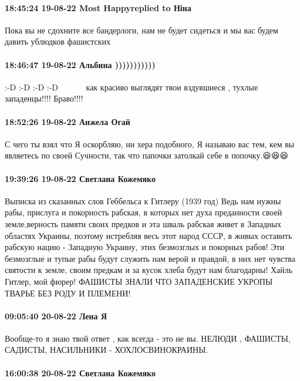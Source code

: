 \paragraph{18:45:24 19-08-22 Most Happyreplied to Ніна}

Пока вы не сдохните все бандерлоги, нам не будет сидеться и мы вас будем давить
ублюдков фашистских

\paragraph{18:46:47 19-08-22 Альбина )))))))))))}

:-D :-D :-D :-D 👏 👏 👏 👏 👏 как красиво выглядят твои вздувшиеся , тухлые
западенцы!!!! Браво!!!!

\paragraph{18:52:26 19-08-22 Анжела Огай}

С чего ты взял что Я оскорбляю, ни хера подобного, Я называю вас тем, кем вы
являетесь по своей Сучности, так что папочки затолкай себе в попочку.😆😆😆

\paragraph{19:39:26 19-08-22 Светлана Кожемяко}

Выписка из сказанных слов Геббельса к Гитлеру (1939 год)
Ведь нам нужны рабы, прислуга и покорность рабская, в которых нет духа преданности своей земле,верность памяти своих предков и эта шваль рабская живет в Западных областях Украины, поэтому истребляя весь этот народ СССР, в живых оставить рабскую нацию - Западную Украину, этих безмозглых и покорных рабов! Эти безмозглые и тупые рабы будут служить нам верой и правдой, в них нет чувства святости к земле, своим предкам и за кусок хлеба будут нам благодарны! Хайль Гитлер, мой фюрер! ФАШИСТЫ ЗНАЛИ ЧТО ЗАПАДЕНСКИЕ УКРОПЫ ТВАРЬЕ БЕЗ РОДУ И ПЛЕМЕНИ!

\paragraph{09:05:40 20-08-22 Лена Я}

Вообще-то я знаю твой ответ , как всегда - это не вы. НЕЛЮДИ , ФАШИСТЫ,
САДИСТЫ, НАСИЛЬНИКИ - ХОХЛОСВИНОКРАИНЫ.

\paragraph{16:00:38 20-08-22 Светлана Кожемяко}

